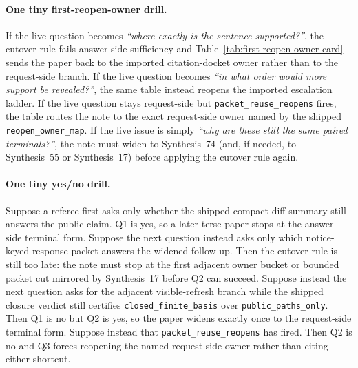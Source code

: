 \documentclass[11pt]{article}
\begin{document}
\paragraph{One tiny first-reopen-owner drill.}
If the live question becomes \emph{``where exactly is the sentence supported?''}, the cutover rule fails answer-side sufficiency and Table~\ref{tab:first-reopen-owner-card} sends the paper back to the imported citation-docket owner rather than to the request-side branch. If the live question becomes \emph{``in what order would more support be revealed?''}, the same table instead reopens the imported escalation ladder. If the live question stays request-side but \nolinkurl{packet_reuse_reopens} fires, the table routes the note to the exact request-side owner named by the shipped \nolinkurl{reopen_owner_map}. If the live issue is simply \emph{``why are these still the same paired terminals?''}, the note must widen to Synthesis~74 (and, if needed, to Synthesis~55 or Synthesis~17) before applying the cutover rule again.

\paragraph{One tiny yes/no drill.}
Suppose a referee first asks only whether the shipped compact-diff summary still answers the public claim. Q1 is yes, so a later terse paper stops at the answer-side terminal form. Suppose the next question instead asks only which notice-keyed response packet answers the widened follow-up. Then the cutover rule is still too late: the note must stop at the first adjacent owner bucket or bounded packet cut mirrored by Synthesis~17 before Q2 can succeed. Suppose instead the next question asks for the adjacent visible-refresh branch while the shipped closure verdict still certifies \nolinkurl{closed_finite_basis} over \nolinkurl{public_paths_only}. Then Q1 is no but Q2 is yes, so the paper widens exactly once to the request-side terminal form. Suppose instead that \nolinkurl{packet_reuse_reopens} has fired. Then Q2 is no and Q3 forces reopening the named request-side owner rather than citing either shortcut.
\end{document}
